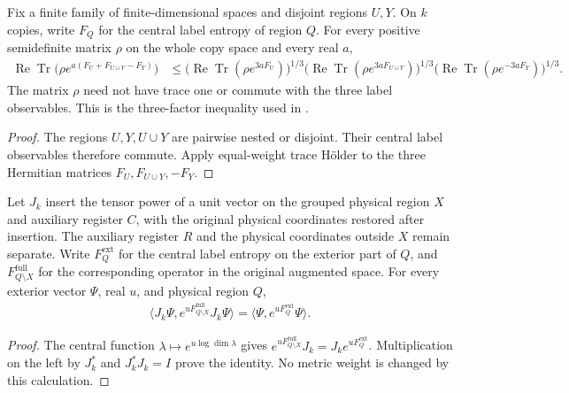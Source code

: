 
\begin{theorem}
    \label{thm:pinned_three_moment_holder}
    \leanok
    Fix a finite family of finite-dimensional spaces and disjoint regions
    $U,Y$. On $k$ copies, write $F_Q$ for the central label entropy of
    region $Q$. For every positive semidefinite matrix $\rho$ on the whole
    copy space and every real $a$,
    \begin{align}
        \operatorname{Re}\operatorname{Tr}
            \bigl(\rho e^{a(F_U+F_{U\cup Y}-F_Y)}\bigr)
        &\leq
        \bigl(\operatorname{Re}\operatorname{Tr}(\rho e^{3aF_U})\bigr)^{1/3}
        \bigl(\operatorname{Re}\operatorname{Tr}(\rho e^{3aF_{U\cup Y}})\bigr)^{1/3}
        \bigl(\operatorname{Re}\operatorname{Tr}(\rho e^{-3aF_Y})\bigr)^{1/3}.
    \end{align}
    The matrix $\rho$ need not have trace one or commute with the three
    label observables. This is the three-factor inequality used in
    \cite[Section~8]{OpenAI2026AreaLaw}.
\end{theorem}
\begin{proof}
    \leanok
    The regions $U,Y,U\cup Y$ are pairwise nested or disjoint. Their
    central label observables therefore commute. Apply equal-weight trace
    H\"older to the three Hermitian matrices $F_U,F_{U\cup Y},-F_Y$.
\end{proof}

\begin{theorem}
    \label{thm:pinned_exponential_bell_insertion}
    \leanok
    Let $J_k$ insert the tensor power of a unit vector on the grouped
    physical region $X$ and auxiliary register $C$, with the original
    physical coordinates restored after insertion. The auxiliary register
    $R$ and the physical coordinates outside $X$ remain separate.
    Write $F_Q^{\mathrm{ext}}$ for the central label entropy on the
    exterior part of $Q$, and $F_{Q\setminus X}^{\mathrm{full}}$ for the
    corresponding operator in the original augmented space.
    For every exterior vector $\Psi$, real $u$, and physical region $Q$,
    \begin{align}
        \langle J_k\Psi,e^{uF_{Q\setminus X}^{\mathrm{full}}}J_k\Psi\rangle
        =\langle\Psi,e^{uF_Q^{\mathrm{ext}}}\Psi\rangle.
    \end{align}
\end{theorem}
\begin{proof}
    \leanok
    The central function $\lambda\mapsto e^{u\log\dim\lambda}$ gives
    $e^{uF_{Q\setminus X}^{\mathrm{full}}}J_k
      =J_ke^{uF_Q^{\mathrm{ext}}}$. Multiplication on the left by
    $J_k^*$ and $J_k^*J_k=I$ prove the identity. No metric weight is
    changed by this calculation.
\end{proof}


